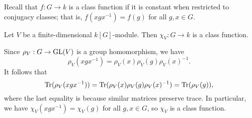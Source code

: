Recall that $f : G \to k$ is a class function if it is constant when restricted 
to conjugacy classes; that is, $f(xgx^{-1}) = f(g)$ for all $g, x \in G$. 

\begin{theo}{}
    Let $V$ be a finite-dimensional $k[G]$-module. Then $\chi_V : G \to k$ is a 
    class function. 
\end{theo}
\begin{pf}
    Since $\rho_V : G \to \operatorname{GL}(V)$ is a group homomorphism, we have 
    \[ \rho_V(xgx^{-1}) = \rho_V(x) \rho_V(g) \rho_V(x)^{-1}. \] 
    It follows that 
    \[ \operatorname{Tr}(\rho_V(xgx^{-1})) = \operatorname{Tr}(\rho_V(x) \rho_V(g) \rho_V(x)^{-1}) 
    = \operatorname{Tr}(\rho_V(g)), \] 
    where the last equality is because similar matrices preserve trace. 
    In particular, we have $\chi_V(xgx^{-1}) = \chi_V(g)$ for all $g, x \in G$, 
    so $\chi_V$ is a class function. 
\end{pf}

